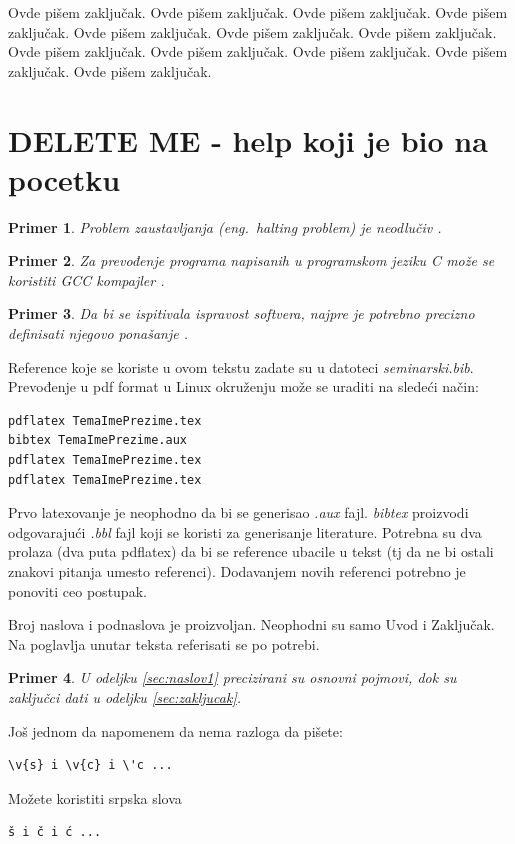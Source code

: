 \documentclass[a4paper]{article}
\newtheorem{primer}{Primer}[section]
\begin{document}
Ovde pišem zaključak.
Ovde pišem zaključak.
Ovde pišem zaključak.
Ovde pišem zaključak.
Ovde pišem zaključak.
Ovde pišem zaključak.
Ovde pišem zaključak.
Ovde pišem zaključak.
Ovde pišem zaključak.
Ovde pišem zaključak.
Ovde pišem zaključak.
Ovde pišem zaključak.



\section{DELETE ME - help koji je bio na pocetku}



\begin{primer}
	Problem zaustavljanja (eng.~{\em halting problem}) je neodlučiv \cite{haltingproblem}.
\end{primer}

\begin{primer}
	Za prevođenje programa napisanih u programskom jeziku C može se koristiti GCC kompajler \cite{gcc}.
\end{primer}

\begin{primer}
	Da bi se ispitivala ispravost softvera, najpre je potrebno precizno definisati njegovo ponašanje \cite{laski2009software}.
\end{primer}

Reference koje se koriste u ovom tekstu zadate su u datoteci {\em seminarski.bib}. Prevođenje u pdf format u Linux okruženju može se uraditi na sledeći način:
\begin{verbatim}
pdflatex TemaImePrezime.tex
bibtex TemaImePrezime.aux
pdflatex TemaImePrezime.tex
pdflatex TemaImePrezime.tex
\end{verbatim}
Prvo latexovanje je neophodno da bi se generisao {\em .aux} fajl. {\em bibtex} proizvodi odgovarajući {\em .bbl} fajl koji se koristi za generisanje literature.
Potrebna su dva prolaza (dva puta pdflatex) da bi se reference ubacile u tekst (tj da ne bi ostali znakovi pitanja umesto referenci). Dodavanjem novih referenci potrebno je ponoviti ceo postupak.


Broj naslova i podnaslova je proizvoljan. Neophodni su samo Uvod i Zaključak. Na poglavlja unutar teksta referisati se po potrebi.
\begin{primer}
	U odeljku \ref{sec:naslov1} precizirani su osnovni pojmovi, dok su zaključci dati u odeljku \ref{sec:zakljucak}.
\end{primer}

Još jednom da napomenem da nema razloga da pišete:
\begin{verbatim}
\v{s} i \v{c} i \'c ...
\end{verbatim}
Možete koristiti srpska slova
\begin{verbatim}
š i č i ć ...
\end{verbatim}


\appendix


\end{document}
